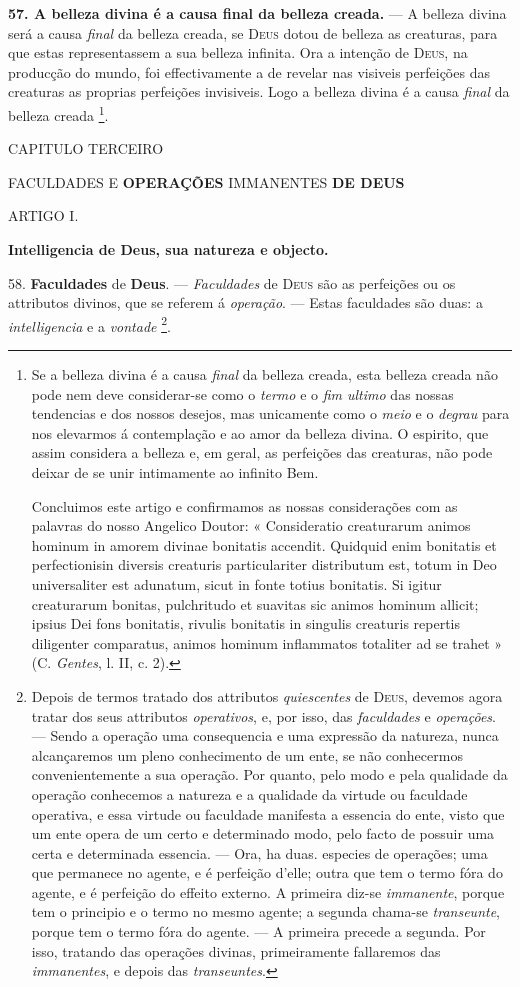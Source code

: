 \textbf{57. A belleza divina é a causa final da belleza creada.} --- A belleza divina será a causa \emph{final} da belleza creada, se \textsc{Deus} dotou de belleza as creaturas, para que estas representassem a sua belleza infinita. Ora a intenção de \textsc{Deus}, na producção do mundo, foi effectivamente a de revelar nas visiveis perfeições das creaturas as proprias perfeições invisiveis. Logo a belleza divina é a causa \emph{final} da belleza creada \footnote{Se a belleza divina é a causa \emph{final} da belleza creada, esta belleza creada não pode nem deve considerar-se como o \emph{termo} e o \emph{fim ultimo} das nossas tendencias e dos nossos desejos, mas unicamente como o \emph{meio} e o \emph{degrau} para nos elevarmos á contemplação e ao amor da belleza divina. O espirito, que assim considera a belleza e, em geral, as perfeições das creaturas, não pode deixar de se unir intimamente ao infinito Bem.\par Concluimos este artigo e confirmamos as nossas considerações com as palavras do nosso Angelico Doutor: « Consideratio creaturarum animos hominum in amorem divinae bonitatis accendit. Quidquid enim bonitatis et perfectionisin diversis creaturis particulariter distributum est, totum in Deo universaliter est adunatum, sicut in fonte totius bonitatis. Si igitur creaturarum bonitas, pulchritudo et suavitas sic animos hominum allicit; ipsius Dei fons bonitatis, rivulis bonitatis in singulis creaturis repertis diligenter comparatus, animos hominum inflammatos totaliter ad se trahet » (C. \emph{Gentes}, l. II, c. 2).}.

 CAPITULO TERCEIRO

FACULDADES E \textbf{OPERAÇÕES} IMMANENTES \textbf{DE DEUS}

ARTIGO I.

\textbf{Intelligencia de Deus, sua natureza e objecto.}

58. \textbf{Faculdades} de \textbf{Deus}. --- \emph{Faculdades} de \textsc{Deus} são as perfeições ou os attributos divinos, que se referem á \emph{operação}. --- Estas faculdades são duas: a \emph{intelligencia} e a \emph{vontade} \footnote{Depois de termos tratado dos attributos \emph{quiescentes} de \textsc{Deus}, devemos agora tratar dos seus attributos \emph{operativos}, e, por isso, das \emph{faculdades} e \emph{operações}. --- Sendo a operação uma consequencia e uma expressão da natureza, nunca alcançaremos um pleno conhecimento de um ente, se não conhecermos convenientemente a sua operação. Por quanto, pelo modo e pela qualidade da operação conhecemos a natureza e a qualidade da virtude ou faculdade operativa, e essa virtude ou faculdade manifesta a essencia do ente, visto que um ente opera de um certo e determinado modo, pelo facto de possuir uma certa e determinada essencia. --- Ora, ha duas. especies de operações; uma que permanece no agente, e é perfeição d'elle; outra que tem o termo fóra do agente, e é perfeição do effeito externo. A primeira diz-se \emph{immanente}, porque tem o principio e o termo no mesmo agente; a segunda chama-se \emph{transeunte}, porque tem o termo fóra do agente. --- A primeira precede a segunda. Por isso, tratando das operações divinas, primeiramente fallaremos das \emph{immanentes}, e depois das \emph{transeuntes}.}.

